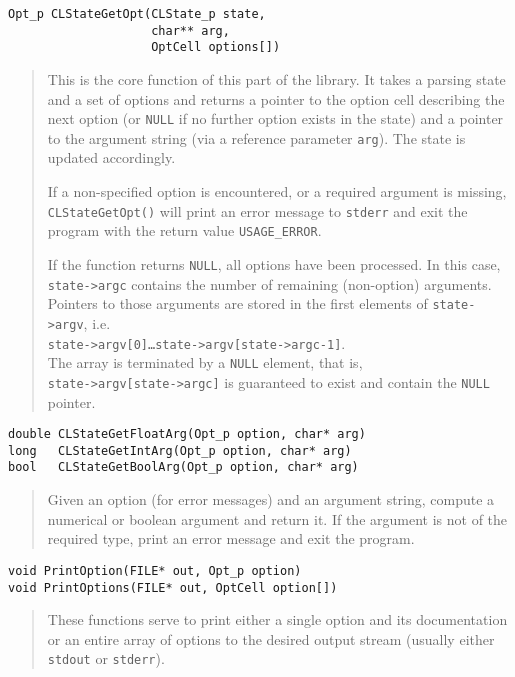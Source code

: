 \begin{verbatim}
Opt_p CLStateGetOpt(CLState_p state, 
                    char** arg,
                    OptCell options[])
\end{verbatim}
\begin{quote}
This is the core function of this part of the library. It takes a
parsing state and a set of options and returns a pointer to the option
cell describing the next option (or \texttt{NULL} if no further option
exists in the state) and a pointer to the argument string (via a
reference parameter \texttt{arg}). The state is updated accordingly. 

If a non-specified option is encountered, or a required argument is
missing, \texttt{CLStateGetOpt()} will print an error message to
\texttt{stderr} and exit the program with the return value
\texttt{USAGE\_ERROR}. 

If the function returns \texttt{NULL}, all options have been
processed. In this case, \texttt{state->argc} contains the number of
remaining (non-option) arguments. Pointers to those arguments are
stored in the first elements of \texttt{state->argv}, i.e.\\
\texttt{state->argv[0]\ldots{}state->argv[state->argc-1]}.\\ The array
is terminated by a \texttt{NULL} element, that is,\\
\texttt{state->argv[state->argc]} is guaranteed to exist and contain
the \texttt{NULL} pointer.
\end{quote}

\begin{verbatim}
double CLStateGetFloatArg(Opt_p option, char* arg)
long   CLStateGetIntArg(Opt_p option, char* arg)
bool   CLStateGetBoolArg(Opt_p option, char* arg)
\end{verbatim}
\begin{quote}
Given an option (for error messages) and an argument string, compute a
numerical or boolean argument and return it. If the argument is not of
the required type, print an error message and exit the program.
\end{quote}

\begin{verbatim}
void PrintOption(FILE* out, Opt_p option)
void PrintOptions(FILE* out, OptCell option[])
\end{verbatim}
\begin{quote}
These functions serve to print either a single option and its
documentation or an entire array of options to the desired output
stream (usually either \texttt{stdout} or \texttt{stderr}).
\end{quote}

